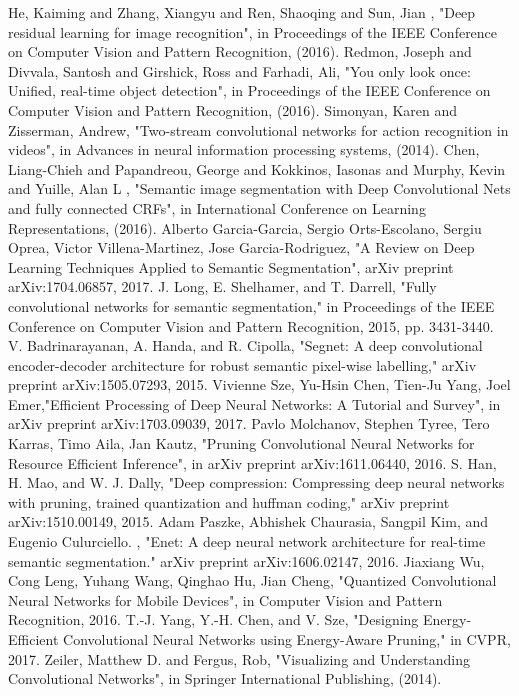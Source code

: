 \documentclass[a4paper,12pt]{article}
\begin{document}
\newpage
\begin{thebibliography}{9}
He, Kaiming and Zhang, Xiangyu and Ren, Shaoqing and Sun, Jian , "Deep residual learning for image recognition", in Proceedings of the IEEE Conference on Computer Vision and Pattern Recognition, (2016).
Redmon, Joseph and Divvala, Santosh and Girshick, Ross and Farhadi, Ali, "You only look once: Unified, real-time object detection", in Proceedings of the IEEE Conference on Computer Vision and Pattern Recognition, (2016).
Simonyan, Karen and Zisserman, Andrew, "Two-stream convolutional networks for action recognition in videos", in Advances in neural information processing systems, (2014).
Chen, Liang-Chieh and Papandreou, George and Kokkinos, Iasonas and Murphy, Kevin and Yuille, Alan L , "Semantic image segmentation with Deep Convolutional Nets and fully connected CRFs", in International Conference on Learning Representations, (2016).
Alberto Garcia-Garcia, Sergio Orts-Escolano, Sergiu Oprea, Victor Villena-Martinez, Jose Garcia-Rodriguez, "A Review on Deep Learning Techniques Applied to Semantic Segmentation", arXiv preprint	arXiv:1704.06857, 2017.
J. Long, E. Shelhamer, and T. Darrell, "Fully convolutional networks for semantic segmentation," in Proceedings of the IEEE Conference on Computer Vision and Pattern Recognition, 2015, pp. 3431-3440.
V. Badrinarayanan, A. Handa, and R. Cipolla, "Segnet: A deep convolutional encoder-decoder architecture for robust semantic pixel-wise labelling," arXiv preprint arXiv:1505.07293, 2015.
Vivienne Sze, Yu-Hsin Chen, Tien-Ju Yang, Joel Emer,"Efficient Processing of Deep Neural Networks: A Tutorial and Survey", in arXiv preprint arXiv:1703.09039, 2017.
Pavlo Molchanov, Stephen Tyree, Tero Karras, Timo Aila, Jan Kautz, "Pruning Convolutional Neural Networks for Resource Efficient Inference", in arXiv preprint arXiv:1611.06440, 2016.
S. Han, H. Mao, and W. J. Dally, "Deep compression: Compressing deep neural networks with pruning, trained quantization and huffman coding," arXiv preprint arXiv:1510.00149, 2015.
Adam Paszke, Abhishek Chaurasia, Sangpil Kim, and Eugenio Culurciello. , "Enet: A deep neural network architecture for real-time semantic segmentation." arXiv preprint arXiv:1606.02147, 2016.
Jiaxiang Wu, Cong Leng, Yuhang Wang, Qinghao Hu, Jian Cheng, "Quantized Convolutional Neural Networks for Mobile Devices", in Computer Vision and Pattern Recognition, 2016.
T.-J. Yang, Y.-H. Chen, and V. Sze, "Designing Energy-Efficient Convolutional Neural Networks using Energy-Aware Pruning," in CVPR, 2017.
Zeiler, Matthew D. and Fergus, Rob, "Visualizing and Understanding Convolutional Networks", in Springer International Publishing, (2014).
\end{thebibliography}
\end{document}
